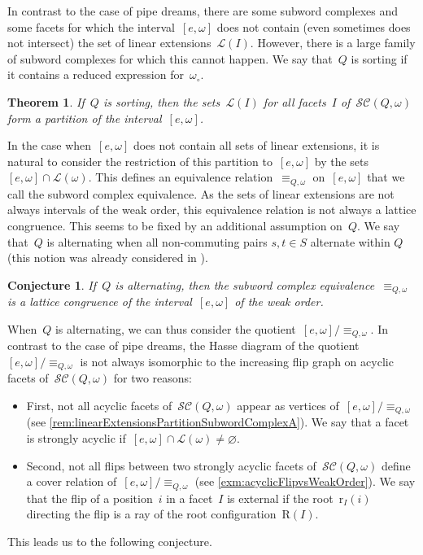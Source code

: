 \documentclass[reqno]{amsart}
\newtheorem{theoremA}{Theorem}
\newtheorem{conjectureA}{Conjecture}
\theoremstyle{definition}
\newcommand{\linearExtensions}{\mathcal{L}} %
\newcommand{\wo}{\omega_\circ} %
\newcommand{\subwordComplex}{\mathcal{SC}} %
\newcommand{\Roots}{\mathrm{R}} %
\newcommand{\rootFunction}[2]{\mathrm{r}_{#1}(#2)} %
\begin{document}
In contrast to the case of pipe dreams, there are some subword complexes and some facets for which the interval~$[e, \omega]$ does not contain (even sometimes does not intersect) the set of linear extensions~$\linearExtensions(I)$.
However, there is a large family of subword complexes for which this cannot happen.
We say that~$Q$ is sorting if it contains a reduced expression for~$\wo$.

\begin{theoremA}
\label{thm:C}
If~$Q$ is sorting, then the sets~$\linearExtensions(I)$ for all facets~$I$ of~$\subwordComplex(Q, \omega)$ form a partition of the interval~$[e, \omega]$.
\end{theoremA}

In the case when~$[e, \omega]$ does not contain all sets of linear extensions, it is natural to consider the restriction of this partition to~$[e, \omega]$ by the sets~$[e, \omega] \cap \linearExtensions(\omega)$.
This defines an equivalence relation~$\equiv_{Q, \omega}$ on~$[e, \omega]$ that we call the subword complex equivalence.
As the sets of linear extensions are not always intervals of the weak order, this equivalence relation is not always a lattice congruence.
This seems to be fixed by an additional assumption on~$Q$.
We say that~$Q$ is alternating when all non-commuting pairs $s, t\in S$ alternate within $Q$ (this notion was already considered in \cite{PilaudSantos-brickPolytope, CeballosLabbeStump}).

\begin{conjectureA}
\label{conj:A}
If~$Q$ is alternating, then the subword complex equivalence~$\equiv_{Q, \omega}$ is a lattice congruence of the interval~$[e, \omega]$ of the weak order.
\end{conjectureA}

When~$Q$ is alternating, we can thus consider the quotient~$[e, \omega]/{\equiv_{Q, \omega}}$.
In contrast to the case of pipe dreams, the Hasse diagram of the quotient~$[e, \omega]/{\equiv_{Q, \omega}}$ is not always isomorphic to the increasing flip graph on acyclic facets of~$\subwordComplex(Q, \omega)$ for two reasons:
\begin{itemize}
\item First, not all acyclic facets of~$\subwordComplex(Q, \omega)$ appear as vertices of~$[e, \omega]/{\equiv_{Q, \omega}}$ (see \cref{rem:linearExtensionsPartitionSubwordComplexA}). We say that a facet is strongly acyclic if~$[e, \omega] \cap \linearExtensions(\omega) \ne \varnothing$.
\item Second, not all flips between two strongly acyclic facets of~$\subwordComplex(Q, \omega)$ define a cover relation of~$[e, \omega]/{\equiv_{Q, \omega}}$ (see \cref{exm:acyclicFlipvsWeakOrder}). We say that the flip of a position~$i$ in a facet~$I$ is external if the root~$\rootFunction{I}{i}$ directing the flip is a ray of the root configuration~$\Roots(I)$.
\end{itemize}
This leads us to the following conjecture.
\end{document}
